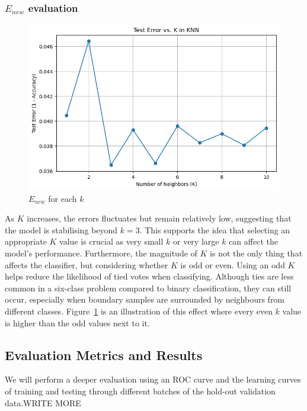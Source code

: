 \documentclass[10pt,twocolumn]{article}
\begin{document}
\subsubsection{$E_{new}$ evaluation}
\begin{figure}[H]
    \centering
    \includegraphics[width=0.85\linewidth]{images/knn/knnn k's.png}
    \caption{$E_{new}$ for each $k$}
    \label{fig:knn-k}
\end{figure}
As $K$ increases, the errors fluctuates but remain relatively low, suggesting that the model is stabilising beyond $k=3$. This supports the idea that selecting an appropriate $K$ value is crucial as very small $k$ or very large $k$ can affect the model's performance. Furthermore, the magnitude of $K$ is not the only thing that affects the classifier, but considering whether $K$ is odd or even. Using an odd $K$ helps reduce the likelihood of tied votes when classifying. Although ties are less common in a six-class problem compared to binary classification, they can still occur, especially when boundary samples are surrounded by neighbours from different classes. Figure~\ref{fig:knn-k} is an illustration of this effect where every even $k$ value is higher than the odd values next to it.
\subsection{Evaluation Metrics and Results}
We will perform a deeper evaluation using an ROC curve and the learning curves of training and testing through different batches of the hold-out validation data.WRITE MORE
\end{document}
